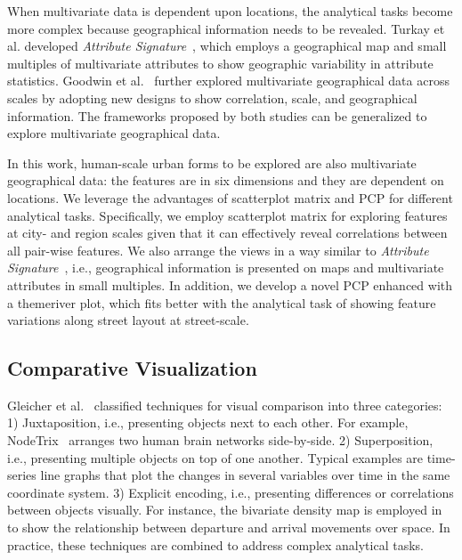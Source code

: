 When multivariate data is dependent upon locations, the analytical tasks become more complex because geographical information needs to be revealed.
Turkay et al. developed \textit{Attribute Signature}~\cite{turkay_2014_attribute}, which employs a geographical map and small multiples of multivariate attributes to show geographic variability in attribute statistics.
Goodwin et al.~\cite{goodwin_2016_visualizing} further explored multivariate geographical data across scales by adopting new designs to show correlation, scale, and geographical information.
The frameworks proposed by both studies can be generalized to explore multivariate geographical data.

In this work, human-scale urban forms to be explored are also multivariate geographical data: the features are in six dimensions and they are dependent on locations.
We leverage the advantages of scatterplot matrix and PCP for different analytical tasks.
Specifically, we employ scatterplot matrix for exploring features at city- and region scales given that it can effectively reveal correlations between all pair-wise features.
We also arrange the views in a way similar to \textit{Attribute Signature}~\cite{turkay_2014_attribute}, i.e., geographical information is presented on maps and multivariate attributes in small multiples. 
In addition, we develop a novel PCP enhanced with a themeriver plot, which fits better with the analytical task of showing feature variations along street layout at street-scale.

\subsection{Comparative Visualization}
Gleicher et al.~\cite{gleicher_2011_visual} classified techniques for visual comparison into three categories:
1) Juxtaposition, i.e., presenting objects next to each other. 
For example, NodeTrix~\cite{yang_2017_blockwise} arranges two human brain networks side-by-side. 
2) Superposition, i.e., presenting multiple objects on top of one another.
Typical examples are time-series line graphs that plot the changes in several variables over time in the same coordinate system.
3) Explicit encoding, i.e., presenting differences or correlations between objects visually.
For instance, the bivariate density map is employed in~\cite{zeng_2017_visualizing} to show the relationship between departure and arrival movements over space.
In practice, these techniques are combined to address complex analytical tasks.

